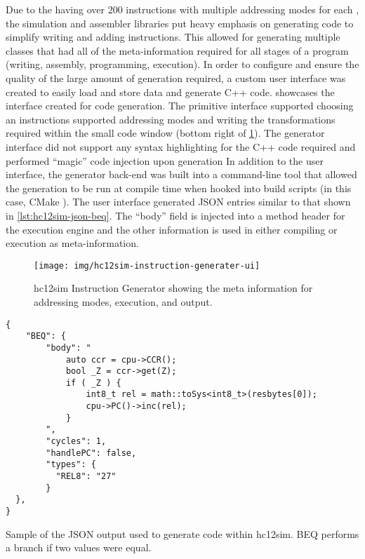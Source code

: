 Due to the \hcmodel{} having over 200 instructions with multiple addressing modes for each \cite{hc12Manual2006}, the simulation and assembler libraries put heavy emphasis on generating code to simplify writing and adding instructions. This allowed for generating multiple classes that had all of the meta-information required for all stages of a program (writing, assembly, programming, execution). In order to configure and ensure the quality of the large amount of generation required, a custom user interface was created to easily load and store data and generate C++ code.  showcases the interface created for code generation. The primitive interface supported choosing an instructions supported addressing modes and writing the transformations required within the small code window (bottom right of \cref{fig:hc12sim-instruction-generater-ui}). The generator interface did not support any syntax highlighting for the C++ code required and performed ``magic'' code injection upon generation \cite[Table~3-1,~p.~30]{hc12Manual2006} In addition to the user interface, the generator back-end was built into a command-line tool that allowed the generation to be run at compile time when hooked into build scripts (in this case, CMake \cite{Kitware:CMake}). The user interface generated JSON entries similar to that shown in \cref{lst:hc12sim-json-beq}. The ``body'' field is injected into a method header for the execution engine and the other information is used in either compiling or execution as meta-information.

\begin{figure}[h!t]
    \centering
    \texttt{[image: img/hc12sim-instruction-generater-ui]}
    \caption{hc12sim Instruction Generator showing the meta information for addressing modes, execution, and output.}
    \label{fig:hc12sim-instruction-generater-ui}
\end{figure}

\begin{listing}[htp]
\begin{verbatim}
{
    "BEQ": {
        "body": "
            auto ccr = cpu->CCR();
            bool _Z = ccr->get(Z);
            if ( _Z ) {
                int8_t rel = math::toSys<int8_t>(resbytes[0]);
                cpu->PC()->inc(rel);
            }
        ",
        "cycles": 1,
        "handlePC": false,
        "types": {
          "REL8": "27"
        }
  },
}
\end{verbatim}
\caption{Sample of the JSON output used to generate code within hc12sim. BEQ performs a branch if two values were equal.}
\label{lst:hc12sim-json-beq}
\end{listing}

